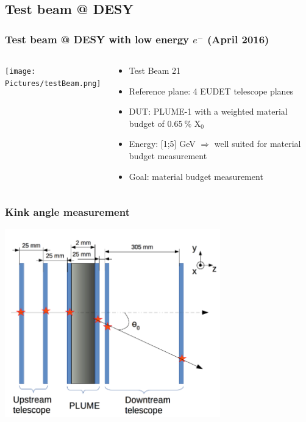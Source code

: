 \documentclass{beamer}
\begin{document}
  \subsection{Test beam @ DESY}

  \begin{frame}
    \frametitle{Test beam @ DESY with low energy $e^-$ (April 2016)}
    
    \begin{columns}[c]
      \begin{column}{5cm}
        \begin{center}
          \texttt{[image: Pictures/testBeam.png]}
        \end{center}
      \end{column}
      \begin{column}{5cm}
        \begin{itemize}
          \item Test Beam 21
          \item Reference plane: 4 EUDET telescope planes
          \item DUT: PLUME-1 with a weighted material budget of $0.65~\%$ X$_0$
          \item Energy: [1;5] GeV $\Rightarrow$ well suited for material budget measurement
          \item Goal: material budget measurement
        \end{itemize}
      \end{column}
    \end{columns}
  \end{frame}

  \begin{frame}
    \frametitle{Kink angle measurement}

    \begin{center}
      \includegraphics[width = 0.7\textwidth]{Pictures/kinkAngleTB.png}
    \end{center}
  \end{frame}
\end{document}
